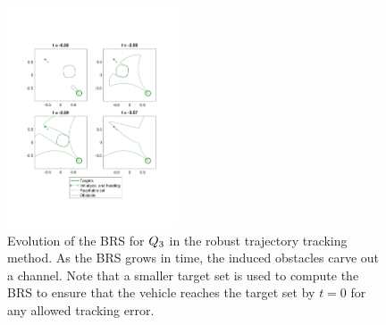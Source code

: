 \begin{figure}[h]
  \centering
  \includegraphics[width=0.45\textwidth]{"fig/rtt_rs3"}
  \caption{Evolution of the BRS for $Q_3$ in the robust trajectory tracking method. As the BRS grows in time, the induced obstacles carve out a channel. Note that a smaller target set is used to compute the BRS to ensure that the vehicle reaches the target set by $t=0$ for any allowed tracking error.}
  \label{fig:rtt_rs3}
\end{figure}